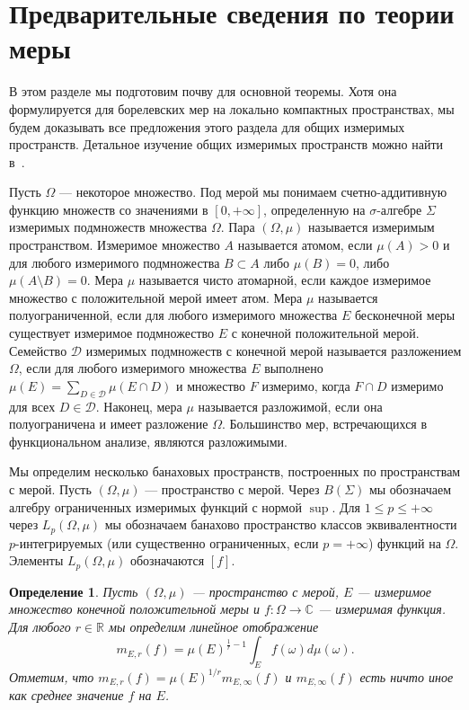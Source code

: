 \documentclass[12pt]{article}
\newtheorem{definition}[theorem]{Определение}
\begin{document}

\section{Предварительные сведения по теории меры}
\label{MeasThPrelim}

В этом разделе мы подготовим почву для основной теоремы. Хотя она формулируется 
для борелевских мер на локально компактных пространствах, мы будем доказывать 
все предложения этого раздела для общих измеримых пространств. Детальное 
изучение общих измеримых пространств можно найти в~\cite{FremMeasTh2}.

Пусть $\Omega$ --- некоторое множество. Под мерой мы понимаем счетно-аддитивную 
функцию множеств со значениями в $[0,+\infty]$, определенную 
на $\sigma$-алгебре $\Sigma$ измеримых подмножеств множества $\Omega$. 
Пара $(\Omega,\mu)$ называется измеримым пространством. 
Измеримое множество $A$ называется атомом, если $\mu(A)>0$ и для любого 
измеримого подмножества $B\subset A$ либо $\mu(B)=0$, 
либо $\mu(A\setminus B)=0$. Мера $\mu$ называется чисто атомарной, если каждое 
измеримое множество с положительной мерой имеет атом. Мера $\mu$ называется 
полуограниченной, если для любого измеримого множества $E$ бесконечной меры 
существует измеримое подмножество $E$ с конечной положительной мерой. 
Семейство $\mathcal{D}$ измеримых подмножеств с конечной мерой называется 
разложением $\Omega$, если для любого измеримого множества $E$ 
выполнено $\mu(E)=\sum_{D\in\mathcal{D}}\mu(E\cap D)$ и множество $F$ измеримо, 
когда $F\cap D$ измеримо для всех $D\in\mathcal{D}$. Наконец, мера $\mu$ 
называется разложимой, если она полуограничена и имеет разложение $\Omega$. 
Большинство мер, встречающихся в функциональном анализе, являются разложимыми.

Мы определим несколько банаховых пространств, построенных по пространствам с 
мерой. Пусть $(\Omega,\mu)$ --- пространство с мерой. Через $B(\Sigma)$ мы 
обозначаем алгебру ограниченных измеримых функций с нормой $\sup$. 
Для $1\leq p\leq +\infty$ через $L_p(\Omega,\mu)$ мы обозначаем банахово 
пространство классов эквивалентности $p$-интегрируемых (или существенно 
ограниченных, если $p=+\infty$) функций на $\Omega$. Элементы $L_p(\Omega,\mu)$ 
обозначаются $[f]$.

\begin{definition}\label{GnrlzdMean}
    Пусть $(\Omega,\mu)$ --- пространство с мерой, $E$ --- измеримое множество 
    конечной положительной меры и $f:\Omega\to\mathbb{C}$ --- измеримая 
    функция. Для любого $r\in\mathbb{R}$ мы определим линейное отображение
    \[
        m_{E,r}(f)=\mu(E)^{\frac{1}{r}-1}\int_E f(\omega)d\mu(\omega).
    \]
    Отметим, что $m_{E,r}(f)=\mu(E)^{1/r}m_{E,\infty}(f)$ и $m_{E,\infty}(f)$ 
    есть ничто иное как среднее значение $f$ на $E$.
\end{definition}
\end{document}
